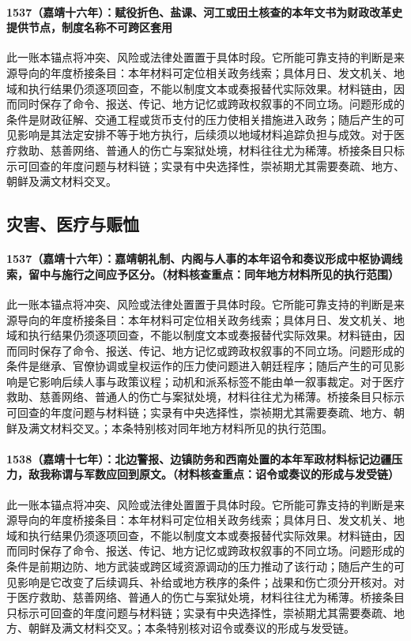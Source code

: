 \paragraph{1537（嘉靖十六年）：赋役折色、盐课、河工或田土核查的本年文书为财政改革史提供节点，制度名称不可跨区套用} 此一账本锚点将冲突、风险或法律处置置于具体时段。它所能可靠支持的判断是来源导向的年度桥接条目：本年材料可定位相关政务线索；具体月日、发文机关、地域和执行结果仍须逐项回查，不能以制度文本或奏报替代实际效果。材料链由，因而同时保存了命令、报送、传记、地方记忆或跨政权叙事的不同立场。问题形成的条件是财政征解、交通工程或货币支付的压力使相关措施进入政务；随后产生的可见影响是其法定安排不等于地方执行，后续须以地域材料追踪负担与成效。对于医疗救助、慈善网络、普通人的伤亡与案狱处境，材料往往尤为稀薄。桥接条目只标示可回查的年度问题与材料链；实录有中央选择性，崇祯期尤其需要奏疏、地方、朝鲜及满文材料交叉。

\subsection{灾害、医疗与赈恤}

\paragraph{1537（嘉靖十六年）：嘉靖朝礼制、内阁与人事的本年诏令和奏议形成中枢协调线索，留中与施行之间应予区分。（材料核查重点：同年地方材料所见的执行范围）} 此一账本锚点将冲突、风险或法律处置置于具体时段。它所能可靠支持的判断是来源导向的年度桥接条目：本年材料可定位相关政务线索；具体月日、发文机关、地域和执行结果仍须逐项回查，不能以制度文本或奏报替代实际效果。材料链由，因而同时保存了命令、报送、传记、地方记忆或跨政权叙事的不同立场。问题形成的条件是继承、官僚协调或皇权运作的压力使问题进入朝廷程序；随后产生的可见影响是它影响后续人事与政策议程；动机和派系标签不能由单一叙事裁定。对于医疗救助、慈善网络、普通人的伤亡与案狱处境，材料往往尤为稀薄。桥接条目只标示可回查的年度问题与材料链；实录有中央选择性，崇祯期尤其需要奏疏、地方、朝鲜及满文材料交叉。；本条特别核对同年地方材料所见的执行范围。

\paragraph{1538（嘉靖十七年）：北边警报、边镇防务和西南处置的本年军政材料标记边疆压力，敌我称谓与军数应回到原文。（材料核查重点：诏令或奏议的形成与发受链）} 此一账本锚点将冲突、风险或法律处置置于具体时段。它所能可靠支持的判断是来源导向的年度桥接条目：本年材料可定位相关政务线索；具体月日、发文机关、地域和执行结果仍须逐项回查，不能以制度文本或奏报替代实际效果。材料链由，因而同时保存了命令、报送、传记、地方记忆或跨政权叙事的不同立场。问题形成的条件是前期边防、地方武装或跨区域资源调动的压力推动了该行动；随后产生的可见影响是它改变了后续调兵、补给或地方秩序的条件；战果和伤亡须分开核对。对于医疗救助、慈善网络、普通人的伤亡与案狱处境，材料往往尤为稀薄。桥接条目只标示可回查的年度问题与材料链；实录有中央选择性，崇祯期尤其需要奏疏、地方、朝鲜及满文材料交叉。；本条特别核对诏令或奏议的形成与发受链。

